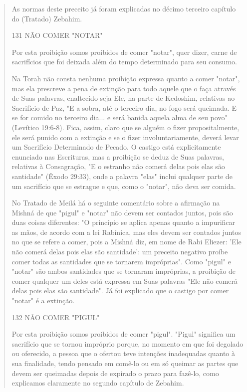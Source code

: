 \begin{quote}
As normas deste preceito já foram explicadas no décimo terceiro
ca­pítulo do (Tratado) Zebahim.

131 NÃO COMER "NOTAR"

Por esta proibição somos proibidos de comer "notar", quer dizer, carne
de sacrifícios que foi deixada além do tempo determinado para seu
consumo.

Na Torah não consta nenhuma proibição expressa quanto a comer "notar",
mas ela prescreve a pena de extinção para todo aquele que o faça
atra­vés de Suas palavras, enaltecido seja Ele, na parte de Kedoshim,
relativas ao Sacrifício de Paz, "E a sobra, até o terceiro dia, no fogo
será queimada. E se for comido no terceiro dia... e será banida aquela
alma de seu povo" (Levítico 19:6-8). Fica, assim, claro que se alguém o
fizer propositalmente, ele será puni­do com a extinção e se o fizer
involuntariamente, deverá levar um Sacrifício Determinado de Pecado. O
castigo está explicitamente enunciado nas Escritu­ras, mas a proibição
se deduz de Suas palavras, relativas à Consagração, "E o estranho não
comerá delas pois elas são santidade" (Êxodo 29:33), onde a pala­vra
"elas" inclui qualquer parte de um sacrifício que se estrague e que,
como o "notar", não deva ser comida.

No Tratado de Meilá há o seguinte comentário sobre a afirmação na Mishná
de que "pigul" e "notar" não devem ser contados juntos, pois são duas
coisas diferentes: "O princípio se aplica apenas quanto a impurificar as
mãos, de acordo com a lei Rabínica, mas eles devem ser contados juntos
no que se refere a comer, pois a Mishná diz, em nome de Rabi Eliezer:
'Ele não comerá delas pois elas são santidade': um preceito negativo
proíbe comer todas as san­tidades que se tornarem impróprias". Como
"pigul" e "notar" são ambos san­tidades que se tornaram impróprias, a
proibição de comer qualquer um deles está expressa em Suas palavras "Ele
não comerá delas pois elas são santidade". Já foi explicado que o
castigo por comer "notar" é a extinção.

132 NÃO COMER "PIGUL"

Por esta proibição somos proibidos de comer "pigul". "Pigul" sig­nifica
um sacrifício que se tornou impróprio porque, no momento em que foi
degolado ou oferecido, a pessoa que o ofertou teve intenções inadequadas
quan­to à sua finalidade, tendo pensado em comê-lo ou em só queimar as
partes que devem ser queimadas depois de expirado o prazo para fazê-lo,
como explica­mos claramente no segundo capítulo de Zebahim.


\end{quote}
